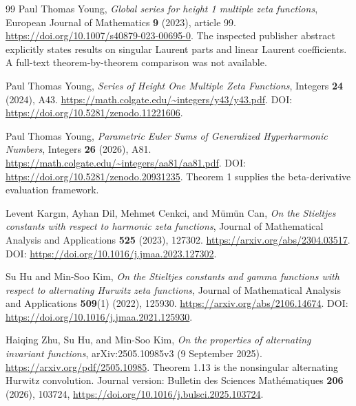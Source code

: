 \documentclass[11pt,letterpaper]{article}
\numberwithin{equation}{section}
\theoremstyle{plain}
\theoremstyle{definition}
\theoremstyle{remark}
\begin{document}
\begin{thebibliography}{99}
Paul Thomas Young,
\emph{Global series for height 1 multiple zeta functions},
European Journal of Mathematics \textbf{9} (2023), article 99.
\url{https://doi.org/10.1007/s40879-023-00695-0}.
The inspected publisher abstract explicitly states results on singular
Laurent parts and linear Laurent coefficients. A full-text theorem-by-theorem
comparison was not available.

Paul Thomas Young,
\emph{Series of Height One Multiple Zeta Functions},
Integers \textbf{24} (2024), A43.
\url{https://math.colgate.edu/~integers/y43/y43.pdf}.
DOI: \url{https://doi.org/10.5281/zenodo.11221606}.

Paul Thomas Young,
\emph{Parametric Euler Sums of Generalized Hyperharmonic Numbers},
Integers \textbf{26} (2026), A81.
\url{https://math.colgate.edu/~integers/aa81/aa81.pdf}.
DOI: \url{https://doi.org/10.5281/zenodo.20931235}.
Theorem 1 supplies the beta-derivative evaluation framework.

Levent Karg{\i}n, Ayhan Dil, Mehmet Cenkci, and M\"um\"un Can,
\emph{On the Stieltjes constants with respect to harmonic zeta functions},
Journal of Mathematical Analysis and Applications \textbf{525}
(2023), 127302.
\url{https://arxiv.org/abs/2304.03517}.
DOI: \url{https://doi.org/10.1016/j.jmaa.2023.127302}.

Su Hu and Min-Soo Kim,
\emph{On the Stieltjes constants and gamma functions with respect to
alternating Hurwitz zeta functions},
Journal of Mathematical Analysis and Applications \textbf{509}(1)
(2022), 125930.
\url{https://arxiv.org/abs/2106.14674}.
DOI: \url{https://doi.org/10.1016/j.jmaa.2021.125930}.

Haiqing Zhu, Su Hu, and Min-Soo Kim,
\emph{On the properties of alternating invariant functions},
arXiv:2505.10985v3 (9 September 2025).
\url{https://arxiv.org/pdf/2505.10985}.
Theorem 1.13 is the nonsingular alternating Hurwitz convolution.
Journal version: Bulletin des Sciences Math\'ematiques \textbf{206}
(2026), 103724,
\url{https://doi.org/10.1016/j.bulsci.2025.103724}.

\end{thebibliography}


\end{document}
